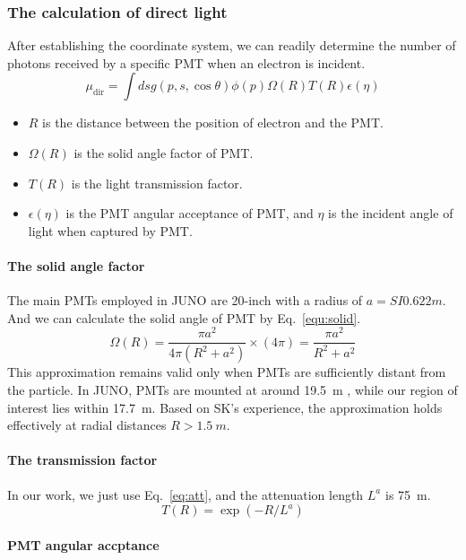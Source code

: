 \subsubsection{The calculation of direct light}
After establishing the coordinate system, we can readily determine the number of photons received by a specific PMT when an electron is incident.
\begin{equation}
	\mu_{\mathrm{dir}}=\int ds g(p,s,\cos\theta)\phi(p)\Omega(R)T(R)\epsilon(\eta)
	\label{equ:directLight}
\end{equation}
\begin{itemize}
	\item $R$ is the distance between the position of electron and the PMT.
	\item $\Omega(R)$ is the solid angle factor of PMT.
	\item $T(R)$ is the light transmission factor.
	\item $\epsilon(\eta)$ is the PMT angular acceptance of PMT, and $\eta$ is the incident angle of light when captured by PMT.
\end{itemize}

\paragraph{The solid angle factor}
The main PMTs employed in JUNO are 20-inch with a radius of $a=SI{0.622}{m}$. And we can calculate the solid angle of PMT by Eq.~\eqref{equ:solid}.
\begin{equation}
	\Omega(R)=\frac{\pi a^2}{4\pi(R^2+a^2)}\times (4\pi)=\frac{\pi a^2}{R^2+a^2}
	\label{equ:solid}
\end{equation}
This approximation remains valid only when PMTs are sufficiently distant from the particle. In JUNO, PMTs are mounted at around \SI{19.5}{m} , while our region of interest lies within \SI{17.7}{m}. Based on SK's experience, the approximation holds effectively at radial distances $R > \SI{1.5}{m}$.

\paragraph{The transmission factor}
In our work, we just use Eq.~\eqref{eq:att}, and the attenuation length $L^{a}$ is \SI{75}{m}.
\begin{equation}
	T(R) = \exp(-R/L^{a})
	\label{eq:att}
\end{equation}

\paragraph{PMT angular accptance}



